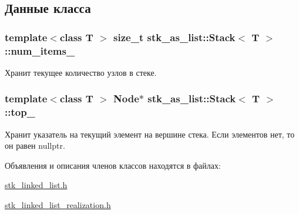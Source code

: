 \subsection{Данные класса}
\hypertarget{classstk__as__list_1_1_stack_aa19d82f1efcce9c75207b8036b9ba9eb}{}
\subsubsection[{num\+\_\+items\+\_\+}]{\setlength{\rightskip}{0pt plus 5cm}template$<$class T $>$ size\+\_\+t {\bf stk\+\_\+as\+\_\+list\+::\+Stack}$<$ T $>$\+::num\+\_\+items\+\_\+\hspace{0.3cm}{\ttfamily [private]}}\label{classstk__as__list_1_1_stack_aa19d82f1efcce9c75207b8036b9ba9eb}


Хранит текущее количество узлов в стеке. 

\hypertarget{classstk__as__list_1_1_stack_a9d4ea95bc7425e321ee82a2e9a05a6b2}{}
\subsubsection[{top\+\_\+}]{\setlength{\rightskip}{0pt plus 5cm}template$<$class T $>$ {\bf Node}$\ast$ {\bf stk\+\_\+as\+\_\+list\+::\+Stack}$<$ T $>$\+::top\+\_\+\hspace{0.3cm}{\ttfamily [private]}}\label{classstk__as__list_1_1_stack_a9d4ea95bc7425e321ee82a2e9a05a6b2}


Хранит указатель на текущий элемент на вершине стека. Если элементов нет, то он равен nullptr. 



Объявления и описания членов классов находятся в файлах\+:\begin{DoxyCompactItemize}
\item 
\hyperlink{stk__linked__list_8h}{stk\+\_\+linked\+\_\+list.\+h}\item 
\hyperlink{stk__linked__list__realization_8h}{stk\+\_\+linked\+\_\+list\+\_\+realization.\+h}\end{DoxyCompactItemize}
